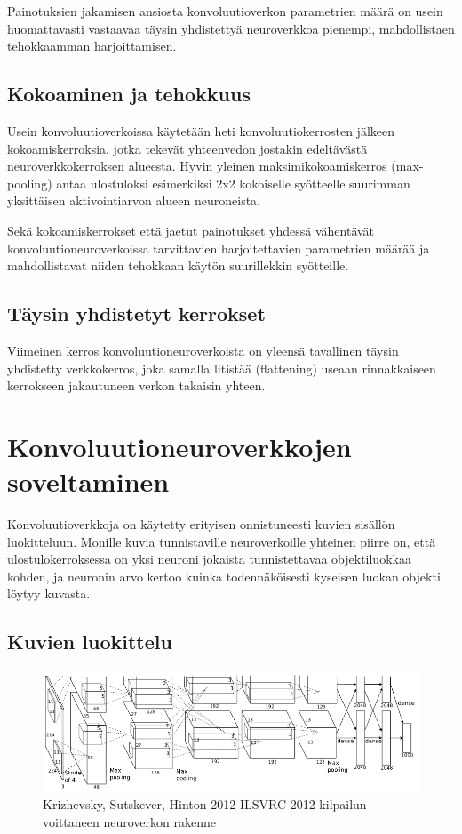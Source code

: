 \documentclass[finnish]{tktltiki2}
\theoremstyle{definition}
\theoremstyle{remark}
\begin{document}
    Painotuksien jakamisen ansiosta konvoluutioverkon parametrien määrä on usein huomattavasti vastaavaa täysin yhdistettyä neuroverkkoa pienempi, mahdollistaen tehokkaamman harjoittamisen.
    \subsection{Kokoaminen ja tehokkuus}
    Usein konvoluutioverkoissa käytetään heti konvoluutiokerrosten jälkeen kokoamiskerroksia, jotka tekevät yhteenvedon jostakin edeltävästä neuroverkkokerroksen alueesta. Hyvin yleinen maksimikokoamiskerros (max-pooling) antaa ulostuloksi esimerkiksi 2x2 kokoiselle syötteelle suurimman yksittäisen aktivointiarvon alueen neuroneista.

    Sekä kokoamiskerrokset että jaetut painotukset yhdessä vähentävät konvoluutioneuroverkoissa tarvittavien harjoitettavien parametrien määrää ja mahdollistavat niiden tehokkaan käytön suurillekkin syötteille.

    \subsection{Täysin yhdistetyt kerrokset}
    Viimeinen kerros konvoluutioneuroverkoista on yleensä tavallinen täysin yhdistetty verkkokerros, joka samalla litistää (flattening) useaan rinnakkaiseen kerrokseen jakautuneen verkon takaisin yhteen.

  \section{Konvoluutioneuroverkkojen soveltaminen}
    Konvoluutioverkkoja on käytetty erityisen onnistuneesti kuvien sisällön luokitteluun. Monille kuvia tunnistaville neuroverkoille yhteinen piirre on, että ulostulokerroksessa on yksi neuroni jokaista tunnistettavaa objektiluokkaa kohden, ja neuronin arvo kertoo kuinka todennäköisesti kyseisen luokan objekti löytyy kuvasta.

  \subsection{Kuvien luokittelu}

    \begin{figure}[h]
    \label{pic:convolution}
    \centering
    \includegraphics[scale=0.4]{imagenet}
    \caption{Krizhevsky, Sutskever, Hinton 2012 ILSVRC-2012 kilpailun voittaneen neuroverkon rakenne \cite{KSHimagenet2012}}
    \end{figure}
\end{document}
